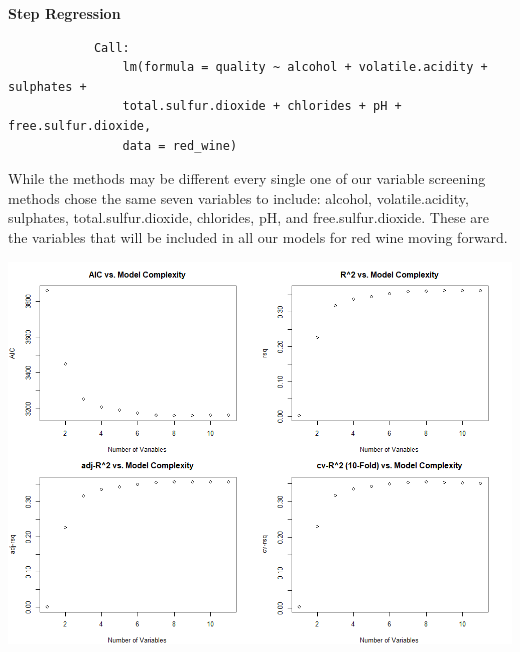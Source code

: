 \documentclass{article}
\begin{document}
	\textbf{Step Regression} 
	\begin{verbatim}
			Call:
				lm(formula = quality ~ alcohol + volatile.acidity + sulphates + 
				total.sulfur.dioxide + chlorides + pH + free.sulfur.dioxide, 
				data = red_wine)
	\end{verbatim}
	
	
	While the methods may be different every single one of our variable screening methods chose the same seven variables 
	to include: alcohol, volatile.acidity, sulphates, total.sulfur.dioxide, chlorides, pH, and free.sulfur.dioxide. These 
	are the variables that will be included in all our models for red wine moving forward. 
	
	\includegraphics[scale=.55]{../plots/Wine/qof_plotR.png}
	
\end{document}
